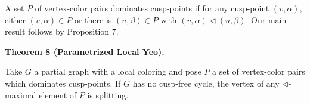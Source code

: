 \documentclass[10pt,a4paper]{amsart}
\begin{document}
 
 
A set $P$ of vertex-color pairs dominates cusp-points if for any cusp-point $(v,\alpha)$, either $(v,\alpha)\in P$ or there is $(u,\beta)\in P$ with $(v,\alpha)\lhd(u,\beta)$. Our main result follows by Proposition 7.\par
 

 
\par\medskip\noindent\textbf{Theorem 8 (Parametrized Local Yeo).}\par
 
 
Take $G$ a partial graph with a local coloring and pose $P$ a set of vertex-color pairs which dominates cusp-points. If $G$ has no cusp-free cycle, the vertex of any $\lhd$-maximal element of $P$ is splitting.\par
 
 
\end{document}
